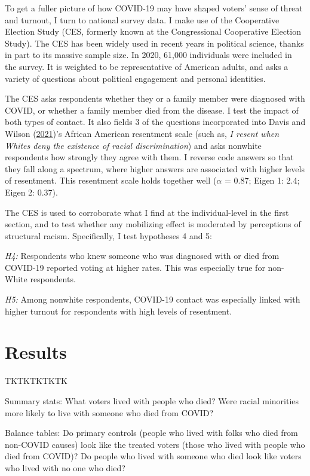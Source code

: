 \documentclass[
  12pt,
]{article}
\begin{document}
To get a fuller picture of how COVID-19 may have shaped voters' sense of threat and turnout, I turn to national survey data. I make use of the Cooperative Election Study (CES, formerly known at the Congressional Cooperative Election Study). The CES has been widely used in recent years in political science, thanks in part to its massive sample size. In 2020, 61,000 individuals were included in the survey. It is weighted to be representative of American adults, and asks a variety of questions about political engagement and personal identities.

The CES asks respondents whether they or a family member were diagnosed with COVID, or whether a family member died from the disease. I test the impact of both types of contact. It also fields 3 of the questions incorporated into Davis and Wilson (\protect\hyperlink{ref-Davis2021}{2021})'s African American resentment scale (such as, \emph{I resent when Whites deny the existence of racial discrimination}) and asks nonwhite respondents how strongly they agree with them. I reverse code answers so that they fall along a spectrum, where higher answers are associated with higher levels of resentment. This resentment scale holds together well (\(\alpha\) = 0.87; Eigen 1: 2.4; Eigen 2: 0.37).

The CES is used to corroborate what I find at the individual-level in the first section, and to test whether any mobilizing effect is moderated by perceptions of structural racism. Specifically, I test hypotheses 4 and 5:

\emph{H4:} Respondents who knew someone who was diagnosed with or died from COVID-19 reported voting at higher rates. This was especially true for non-White respondents.

\emph{H5:} Among nonwhite respondents, COVID-19 contact was especially linked with higher turnout for respondents with high levels of resentment.

\hypertarget{results}{%
\section*{Results}\label{results}}

TKTKTKTKTK

Summary stats: What voters lived with people who died? Were racial minorities more likely to live with someone who died from COVID?

Balance tables: Do primary controls (people who lived with folks who died from non-COVID causes) look like the treated voters (those who lived with people who died from COVID)? Do people who lived with someone who died look like voters who lived with no one who died?
\end{document}
